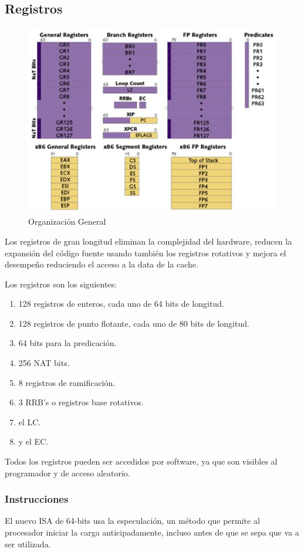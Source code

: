\documentclass[11pt, conference]{IEEEtran}
\begin{document}
\subsection{Registros}
\begin{figure}[h]
	\begin{center}
		\includegraphics[scale=0.4]{2.png}
		\caption{Organización General} 
	\end{center}
\end{figure}
Los registros de gran longitud eliminan la complejidad del hardware, reducen la expansión del código fuente usando también los registros rotativos y mejora el desempeño reduciendo el acceso a la data de la cache.

Los registros son los siguientes:
\begin{enumerate}
\item 128 registros de enteros, cada uno de 64 bits de longitud.
\item 128 registros de punto flotante, cada uno de 80 bits de longitud.
\item 64 bits para la predicación.
\item 256 NAT bits.
\item 8 registros de ramificación.
\item 3 RRB's o registros base rotativos.
\item el LC.
\item y el EC.
\end{enumerate}
Todos los registros pueden ser accedidos por software, ya que son visibles al programador y de acceso aleatorio.

\subsubsection{Instrucciones}
El nuevo ISA de 64-bits usa la especulación, un método que permite al procesador iniciar la carga anticipadamente, incluso antes de que se sepa que va a ser utilizada.
\end{document}
